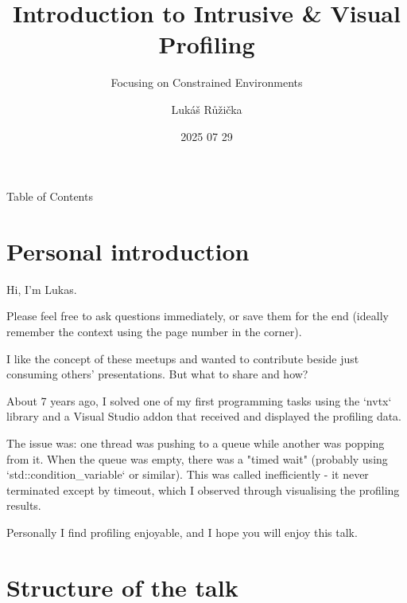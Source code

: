 \documentclass[aspectratio=169]{beamer}
\title{Introduction to Intrusive \& Visual Profiling}
\subtitle{Focusing on Constrained Environments}
\author{Lukáš Růžička}
\institute{Prague C++ Meetup}
\date{2025 07 29}
\begin{document}
\frame{\titlepage}

\begin{frame}{Table of Contents}
\tableofcontents[hideallsubsections]
\end{frame}




\section{Personal introduction}

\begin{frame}
    Hi, I'm Lukas.

    Please feel free to ask questions immediately, or save them for the end (ideally remember the context using the page number in the corner).

    I like the concept of these meetups and wanted to contribute beside just consuming others' presentations. But what to share and how?

    About 7 years ago, I solved one of my first programming tasks using the `nvtx` library and a Visual Studio addon that received and displayed the profiling data.

    The issue was: one thread was pushing to a queue while another was popping from it. When the queue was empty, there was a "timed wait" (probably using `std::condition\_variable` or similar). This was called inefficiently - it never terminated except by timeout, which I observed through visualising the profiling results.

    Personally I find profiling enjoyable, and I hope you will enjoy this talk.

\end{frame}



\section{Structure of the talk}
\end{document}
